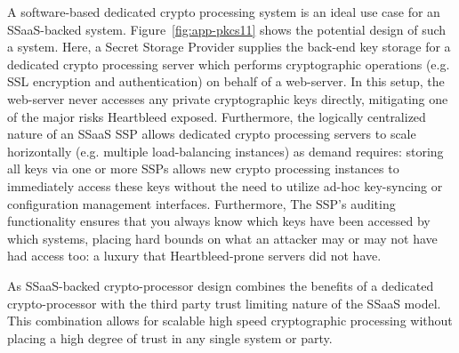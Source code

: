 A software-based dedicated crypto processing system is an ideal use
case for an SSaaS-backed system. Figure~\ref{fig:app-pkcs11} shows the
potential design of such a system. Here, a Secret Storage Provider
supplies the back-end key storage for a dedicated crypto processing
server which performs cryptographic operations (e.g. SSL encryption
and authentication) on behalf of a web-server. In this setup, the
web-server never accesses any private cryptographic keys directly,
mitigating one of the major risks Heartbleed exposed. Furthermore, the
logically centralized nature of an SSaaS SSP allows dedicated crypto
processing servers to scale horizontally (e.g. multiple load-balancing
instances) as demand requires: storing all keys via one or more SSPs
allows new crypto processing instances to immediately access these
keys without the need to utilize ad-hoc key-syncing or configuration
management interfaces. Furthermore, The SSP's auditing functionality
ensures that you always know which keys have been accessed by which
systems, placing hard bounds on what an attacker may or may not have
had access too: a luxury that Heartbleed-prone servers did not have.

As SSaaS-backed crypto-processor design combines the benefits of a
dedicated crypto-processor with the third party trust limiting nature
of the SSaaS model. This combination allows for scalable high speed
cryptographic processing without placing a high degree of trust in any
single system or party.

